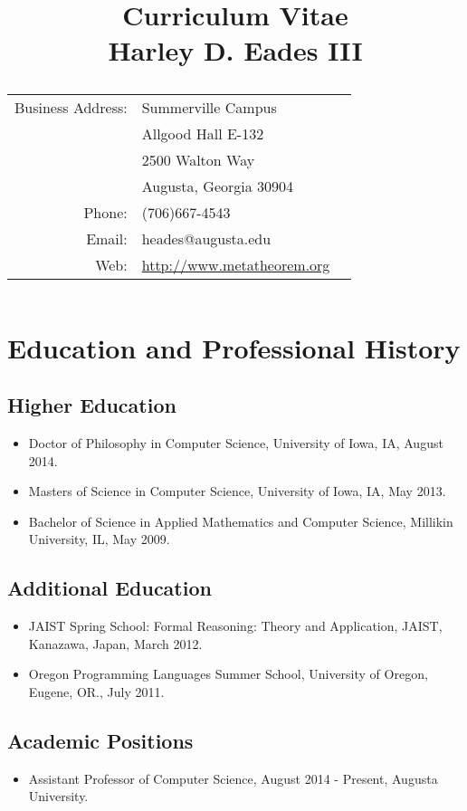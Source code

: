 \documentclass{article}
\title{\textbf{Curriculum Vitae\\Harley D. Eades III}\\
  \vspace{10px}
  {\normalsize
  \begin{tabular}{rll}
    Business Address: & Summerville Campus\\
                      & Allgood Hall E-132\\
                      & 2500 Walton Way\\
                      & Augusta, Georgia 30904\\
    Phone:            & (706)667-4543\\
    Email:            & heades@augusta.edu\\
    Web:              & \url{http://www.metatheorem.org}\\
\end{tabular}
}}
\date{}
\begin{document}
\maketitle




  
  \section{Education and Professional History} 

  \subsection{Higher Education}
  \label{subsec:higher_education}
  \begin{itemize}
  \item[] Doctor of Philosophy in Computer Science, University of Iowa, IA, August 2014.
  \item[] Masters of Science in Computer Science, University of Iowa, IA, May 2013.
  \item[] Bachelor of Science in Applied Mathematics and Computer Science, Millikin University, IL, May 2009.
  \end{itemize}
		
  \subsection{Additional Education} 
  \begin{itemize}
  \item[] JAIST Spring School: Formal Reasoning: Theory and Application, JAIST, Kanazawa, Japan, March 2012.

  \item[] Oregon Programming Languages Summer School, University of Oregon, Eugene, OR., July 2011.
  \end{itemize}
  
  \subsection{Academic Positions}
  \begin{itemize}
  \item[] Assistant Professor of Computer Science, August 2014 - Present, Augusta University.
  \end{itemize}
\end{document}
